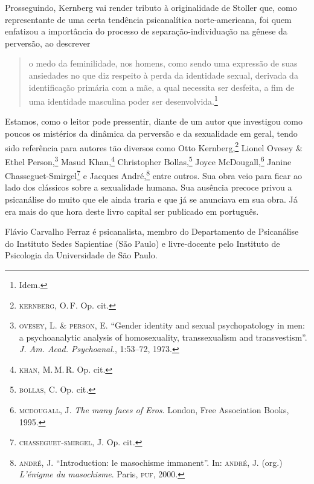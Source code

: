 Prosseguindo, Kernberg vai render tributo à originalidade de Stoller
que, como representante de uma certa tendência psicanalítica
norte-americana, foi quem enfatizou a importância do processo de
separação-individuação na gênese da perversão, ao descrever

\begin{quote}
o medo da feminilidade, nos homens, como sendo uma expressão de suas
ansiedades no que diz respeito à perda da identidade sexual, derivada da
identificação primária com a mãe, a qual necessita ser desfeita, a fim
de uma identidade masculina poder ser desenvolvida.\footnote{Idem\emph{.}}
\end{quote}

Estamos, como o leitor pode pressentir, diante de um autor que
investigou como poucos os mistérios da dinâmica da perversão e da
sexualidade em geral, tendo sido referência para autores tão diversos
como Otto Kernberg,\footnote{\textsc{kernberg}, O.\,F. Op. cit.} Lionel
Ovesey \& Ethel Person,\footnote{\textsc{ovesey}, L. \& \textsc{person},
  E. ``Gender identity and sexual psychopatology in men: a
  psychoanalytic analysis of homosexuality, transsexualism and
  transvestism''. \emph{J. Am. Acad. Psychoanal.}, 1:53--72, 1973.}
Masud Khan,\footnote{\textsc{khan}, M.\,M.\,R. Op. cit.} Christopher
Bollas,\footnote{\textsc{bollas}, C. Op. cit\emph{.}} Joyce
McDougall,\footnote{\textsc{mcdougall}, J. \emph{The many faces of Eros}.
  London, Free Association Books, 1995.} Janine
Chasseguet-Smirgel\footnote{\textsc{chasseguet-smirgel}, J. Op.
  cit\emph{.}} e Jacques André,\footnote{\textsc{andré}, J.
  ``Introduction: le masochisme immanent''. In: \textsc{andré}, J.
  (org.) \emph{L'énigme du masochisme}. Paris, \textsc{puf}, 2000.}
entre outros. Sua obra veio para ficar ao lado dos clássicos sobre a
sexualidade humana. Sua ausência precoce privou a psicanálise do muito
que ele ainda traria e que já se anunciava em sua obra. Já era mais do
que hora deste livro capital ser publicado em português.

{\par\vfill\noindent\footnotesize
Flávio Carvalho Ferraz é psicanalista, membro do
  Departamento de Psicanálise do Instituto Sedes Sapientiae (São Paulo)
  e livre-docente pelo Instituto de Psicologia da Universidade de São
  Paulo.
}
